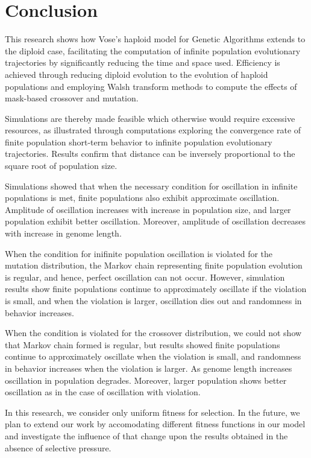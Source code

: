 \chapter{Conclusion}
This research shows how Vose's haploid model for Genetic Algorithms
extends to the diploid case, facilitating the computation of infinite
population evolutionary trajectories by significantly reducing the
time and space used.  Efficiency is achieved through reducing diploid evolution 
to the evolution of haploid populations
and employing Walsh transform methods to compute the effects of
mask-based crossover and mutation.  

Simulations are thereby made feasible which otherwise would require
excessive resources, as illustrated through computations exploring 
the convergence rate of finite population short-term behavior to infinite population evolutionary trajectories. 
Results confirm that distance can be inversely proportional to the square root of population size.

Simulations showed that when the necessary condition for oscillation in infinite populations is met, 
finite populations also exhibit approximate oscillation. Amplitude of oscillation increases with 
increase in population size, and larger population exhibit better oscillation. Moreover, amplitude of 
oscillation decreases with increase in genome length.

When the condition for inifinite population oscillation is violated for the mutation distribution, 
the Markov chain representing finite population evolution is regular, and hence, 
perfect oscillation can not occur. However, simulation results show 
finite populations continue to approximately oscillate if the violation is small, 
and when the violation is larger, oscillation dies out and randomness in behavior increases. 

When the condition is violated for the crossover distribution,
we could not show that Markov chain formed is regular, 
but results showed finite populations continue to approximately oscillate 
when the violation is small, and randomness in behavior increases when the violation is larger. 
As genome length increases oscillation in population degrades. 
Moreover, larger population shows better oscillation 
as in the case of oscillation with violation.

In this research, we consider only uniform fitness for selection.  
In the future, we plan to extend our work by accomodating different fitness functions in our model and investigate 
the influence of that change upon the results obtained in the absence of selective pressure.



